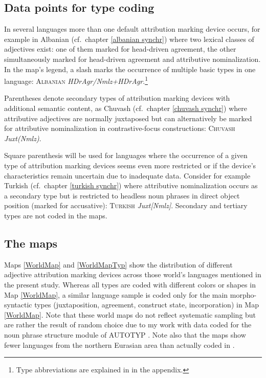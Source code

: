 \subsection[Type coding]{Data points for type coding}
In several languages more than one default attribution marking device occurs, for example in Albanian (cf.~chapter \ref{albanian synchr}) where two lexical classes of adjectives exist: one of them marked for head-driven agreement, the other simultaneously marked for head-driven agreement and attributive nominalization. In the map's legend, a slash marks the occurrence of multiple basic types in one language: \textsc{Albanian} \textit{HDrAgr/Nmlz+HDrAgr}.\footnote{Type abbreviations are explained in  in the appendix.}

Parentheses denote secondary types of attribution marking devices with additional semantic content, as Chuvash (cf.~chapter \ref{chuvash synchr}) where attributive adjectives are normally juxtaposed but can alternatively be marked for attributive nominalization in contrastive-focus constructions: \textsc{Chuvash} \textit{Juxt(Nmlz)}.

Square parenthesis will be used for languages where the occurrence of a given type of attribution marking devices seems even more restricted or if the device's characteristics remain uncertain due to inadequate data. Consider for example Turkish (cf.~chapter \ref{turkish synchr}) where attributive nominalization occurs as a secondary type but is restricted to headless noun phrases in direct object position (marked for accusative): \textsc{Turkish} \textit{Juxt[Nmlz]}. 
Secondary and tertiary types are not coded in the maps. 

\subsection{The maps}
Maps \ref{WorldMap} and \ref{WorldMapTyp} show the distribution of different adjective attribution marking devices across those world's languages mentioned in the present study. Whereas all types are coded with different colors or shapes in Map \ref{WorldMap}, a similar language sample is coded only for the main morpho-syntactic types (juxtaposition, agreement, construct state, incorporation) in Map \ref{WorldMap}. Note that these world maps do not reflect systematic sampling but are rather the result of random choice due to my work with data coded for the noun phrase structure module of AUTOTYP \citep{AUTOTYP-NP}. Note also that the maps show fewer languages from the northern Eurasian area than actually coded in .

